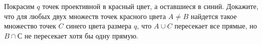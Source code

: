 Покрасим $q$ точек проективной в красный цвет, а оставшиеся в синий. Докажите, что для любых двух множеств точек красного
цвета $A \neq B$ найдется такое множество точек $C$ синего цвета размера $q$, что $A \cup C$ пересекает все прямые, но
$B \cap С$ не пересекает хотя бы одну прямую.
